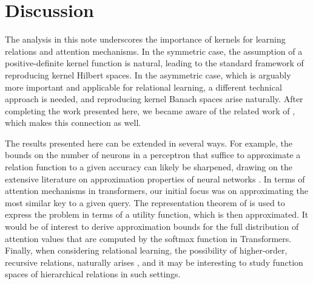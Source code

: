 \section{Discussion}

The analysis in this note underscores the importance of kernels for learning relations and attention mechanisms. 
In the symmetric case, the assumption of a positive-definite kernel function is natural, leading to the standard framework of reproducing kernel Hilbert spaces. In the asymmetric case, which is arguably more important and applicable for relational learning, a different technical approach is needed, and reproducing kernel Banach spaces arise naturally. After completing the work presented here, we became aware of the related work 
of \citet{wright2021transformers}, which makes this connection as well. 

The results presented here can be extended in several ways. For example, the bounds on the 
number of neurons in a perceptron that suffice to approximate a relation function to a given accuracy can likely be sharpened, drawing on the extensive literature on approximation properties of neural networks 
\citep[e.g.,][]{petrushev1998approximation,pinkus1999approximation,makovoz1998uniform,burger2001error,maiorov2006approximation,bachBreakingCurseDimensionality2016}. In terms of attention mechanisms in transformers, our initial focus was on approximating the most similar key to a given query. The representation theorem of \citet{debreuRepresentationPreferenceOrdering1954} is used to express the problem in terms of a utility function, which is then approximated. It would be of interest to derive approximation bounds for the full distribution 
of attention values that are computed by the softmax function in Transformers. Finally, when considering 
relational learning, the possibility of higher-order, recursive relations, naturally arises \citep[e.g.,][]{altabaaRelationalConvolutionalNetworks2023}, and it may be interesting to study function spaces of hierarchical relations in such settings.

